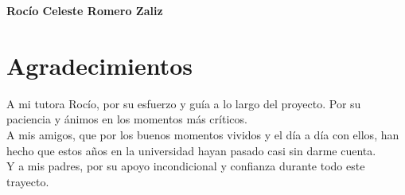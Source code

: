 \noindent \textbf{Rocío Celeste Romero Zaliz}

\chapter*{Agradecimientos}
\thispagestyle{empty}

       \vspace{1cm}


A mi tutora Rocío, por su esfuerzo y guía a lo largo del proyecto. Por su paciencia y ánimos en los momentos más críticos.
\\

A mis amigos, que por los buenos momentos vividos y el día a día con ellos, han hecho que estos años en la universidad hayan pasado casi sin darme cuenta.
\\

Y a mis padres, por su apoyo incondicional y confianza durante todo este trayecto. 